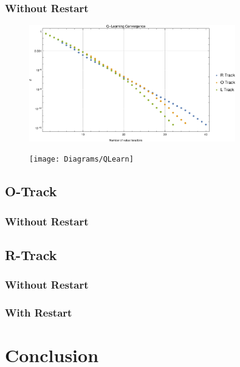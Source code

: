 \documentclass{article}
\begin{document}
			\subsubsection{Without Restart}
			
				\begin{figure}[h!]
					\centering
					\includegraphics[width=0.8\textwidth]{Diagrams/VIter}
					\caption{}
					\label{VIter}
				\end{figure}
				
				
				
				\begin{figure}[h!]
					\centering
					\texttt{[image: Diagrams/QLearn]}
					\caption{}
					\label{QLearn}
				\end{figure}
			
		\subsection{O-Track}
			\subsubsection{Without Restart}
		\subsection{R-Track}
			\subsubsection{Without Restart}
			\subsubsection{With Restart}
	\section{Conclusion}


		
	
\end{document}
